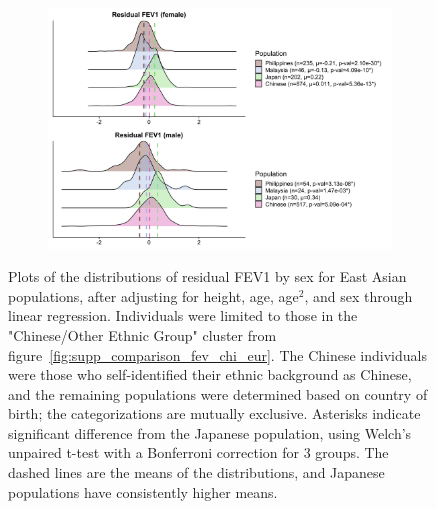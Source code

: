 \documentclass[12pt]{pnas-new}
\begin{document}
\begin{figure}
    \centering
    \begin{subfigure}{\textwidth}
    \includegraphics[width=\textwidth]{images/east_asia_ridgeplots_fev.png}
    \end{subfigure}
    \caption{Plots of the distributions of residual FEV1 by sex for East Asian populations, after adjusting for height, age, age$^2$, and sex through linear regression. Individuals were limited to those in the "Chinese/Other Ethnic Group" cluster from figure~\ref{fig:supp_comparison_fev_chi_eur}. The Chinese individuals were those who self-identified their ethnic background as Chinese, and the remaining populations were determined based on country of birth; the categorizations are mutually exclusive. Asterisks indicate significant difference from the Japanese population, using Welch's unpaired t-test with a Bonferroni correction for 3 groups. The dashed lines are the means of the distributions, and Japanese populations have consistently higher means.}
    \label{fig:supp_fev_ridgeplots}
\end{figure}
\end{document}
